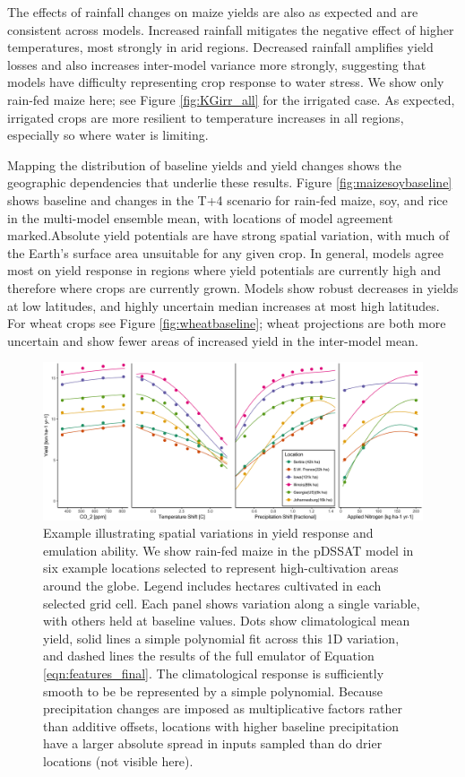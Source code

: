\documentclass[preprint, 5p, times, twocolumn]{elsarticle}
\begin{document}
The effects of rainfall changes on maize yields are also as expected and are consistent across models. Increased rainfall mitigates the negative effect of higher temperatures, most strongly in arid regions. Decreased rainfall amplifies yield losses and also increases inter-model variance more strongly, suggesting that models have difficulty representing crop response to water stress.  We show only rain-fed maize here; see Figure \ref{fig:KGirr_all} for the irrigated case. As expected, irrigated crops are more resilient to temperature increases in all regions, especially so where water is limiting.  

Mapping the distribution of baseline yields and yield changes shows the geographic dependencies that underlie these results. Figure \ref{fig:maizesoybaseline} shows baseline and changes in the T+4 scenario for rain-fed maize, soy, and rice in the multi-model ensemble mean, with locations of model agreement marked.Absolute yield potentials are have strong spatial variation, with much of the Earth's surface area unsuitable for any given crop. In general, models agree most on yield response in regions where yield potentials are currently high and therefore where crops are currently grown. Models show robust decreases in yields at low latitudes, and highly uncertain median increases at most high latitudes. For wheat crops see Figure \ref{fig:wheatbaseline}; wheat projections are both more uncertain and show fewer areas of increased yield in the inter-model mean. 

\begin{figure}[!h]
\centering
    \includegraphics[width=0.95\linewidth]{regression_areas.png}
    \caption{Example illustrating spatial variations in yield response and emulation ability. We show rain-fed maize in the pDSSAT model in six example locations selected to represent high-cultivation areas around the globe. Legend includes hectares cultivated in each selected grid cell. Each panel shows variation along a single variable, with others held at baseline values. Dots show climatological mean yield, solid lines a simple polynomial fit across this 1D variation, and dashed lines the results of the full emulator of Equation \ref{eqn:features_final}. The climatological response is sufficiently smooth to be be represented by a simple polynomial. Because precipitation changes are imposed as multiplicative factors rather than additive offsets, locations with higher baseline precipitation have a larger absolute spread in inputs sampled than do drier locations (not visible here).}
   \label{fig:regression}
\end{figure}
\end{document}
